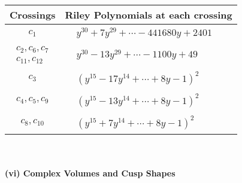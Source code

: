 \documentclass[1p]{elsarticle_modified}
\theoremstyle{definition}
\begin{document}
\begin{tabular}{m{50pt}|m{274pt}}
Crossings & \hspace{64pt}Riley Polynomials at each crossing \\
\hline $$\begin{aligned}c_{1}\end{aligned}$$&$\begin{aligned}
&y^{30}+7 y^{29}+\cdots-441680 y+2401
\end{aligned}$\\
\hline $$\begin{aligned}c_{2},c_{6},c_{7}\\c_{11},c_{12}\end{aligned}$$&$\begin{aligned}
&y^{30}-13 y^{29}+\cdots-1100 y+49
\end{aligned}$\\
\hline $$\begin{aligned}c_{3}\end{aligned}$$&$\begin{aligned}
&(y^{15}-17 y^{14}+\cdots+8 y-1)^{2}
\end{aligned}$\\
\hline $$\begin{aligned}c_{4},c_{5},c_{9}\end{aligned}$$&$\begin{aligned}
&(y^{15}-13 y^{14}+\cdots+8 y-1)^{2}
\end{aligned}$\\
\hline $$\begin{aligned}c_{8},c_{10}\end{aligned}$$&$\begin{aligned}
&(y^{15}+7 y^{14}+\cdots+8 y-1)^{2}
\end{aligned}$\\
\hline
\end{tabular}\\~\\
\newpage\flushleft \textbf{(vi) Complex Volumes and Cusp Shapes}
\end{document}
